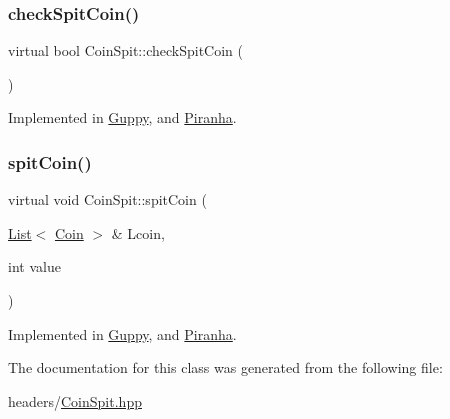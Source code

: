 \subsubsection{\texorpdfstring{check\+Spit\+Coin()}{checkSpitCoin()}}
{\footnotesize\ttfamily virtual bool Coin\+Spit\+::check\+Spit\+Coin (\begin{DoxyParamCaption}{ }\end{DoxyParamCaption})\hspace{0.3cm}{\ttfamily [pure virtual]}}



Implemented in \mbox{\hyperlink{class_guppy_abab3975de3a054b14aa3b8e664e30b5b}{Guppy}}, and \mbox{\hyperlink{class_piranha_a9db3ab2f9933739f5744e881f9ee386e}{Piranha}}.

\mbox{\label{class_coin_spit_a336f45a90c4b0b57017b45a5c68f12a7}} 
\subsubsection{\texorpdfstring{spit\+Coin()}{spitCoin()}}
{\footnotesize\ttfamily virtual void Coin\+Spit\+::spit\+Coin (\begin{DoxyParamCaption}\item[{\mbox{\hyperlink{class_list}{List}}$<$ \mbox{\hyperlink{class_coin}{Coin}} $>$ \&}]{Lcoin,  }\item[{int}]{value }\end{DoxyParamCaption})\hspace{0.3cm}{\ttfamily [pure virtual]}}



Implemented in \mbox{\hyperlink{class_guppy_a39dfc2b44aed14f056bddcc08ff7c598}{Guppy}}, and \mbox{\hyperlink{class_piranha_a4c1c29b2e68b4cb6eb2a295af74bf291}{Piranha}}.



The documentation for this class was generated from the following file\+:\begin{DoxyCompactItemize}
\item 
headers/\mbox{\hyperlink{_coin_spit_8hpp}{Coin\+Spit.\+hpp}}\end{DoxyCompactItemize}
